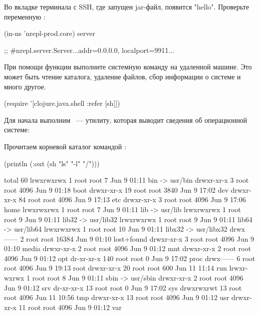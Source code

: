 Во вкладке терминала с SSH, где запущен jar-файл, появится "hello". Проверьте переменную :

\begin{english}
  \begin{clojure}
(in-ns 'nrepl-prod.core)
server

;; #nrepl.server.Server{...addr=0.0.0.0, localport=9911...}
  \end{clojure}
\end{english}

При помощи функции  выполните системную команду на удаленной машине. Это может быть чтение каталога, удаление файлов, сбор информации о системе и много другое.

\begin{english}
  \begin{clojure}
(require '[clojure.java.shell :refer [sh]])
  \end{clojure}
\end{english}

Для начала выполним ~--- утилиту, которая выводит сведения об операционной системе:

\begin{english}
\end{english}

Прочитаем корневой каталог командой :

\begin{english}
  \begin{text}
(println (:out (sh "ls" "-l" "/")))

total 60
lrwxrwxrwx   1 root root     7 Jun  9 01:11 bin -> usr/bin
drwxr-xr-x   3 root root  4096 Jun  9 01:18 boot
drwxr-xr-x  19 root root  3840 Jun  9 17:02 dev
drwxr-xr-x  84 root root  4096 Jun  9 17:13 etc
drwxr-xr-x   3 root root  4096 Jun  9 17:06 home
lrwxrwxrwx   1 root root     7 Jun  9 01:11 lib -> usr/lib
lrwxrwxrwx   1 root root     9 Jun  9 01:11 lib32 -> usr/lib32
lrwxrwxrwx   1 root root     9 Jun  9 01:11 lib64 -> usr/lib64
lrwxrwxrwx   1 root root    10 Jun  9 01:11 libx32 -> usr/libx32
drwx------   2 root root 16384 Jun  9 01:10 lost+found
drwxr-xr-x   3 root root  4096 Jun  9 01:10 media
drwxr-xr-x   2 root root  4096 Jun  9 01:12 mnt
drwxr-xr-x   2 root root  4096 Jun  9 01:12 opt
dr-xr-xr-x 140 root root     0 Jun  9 17:02 proc
drwx------   6 root root  4096 Jun  9 19:13 root
drwxr-xr-x  20 root root   600 Jun 11 11:14 run
lrwxrwxrwx   1 root root     8 Jun  9 01:11 sbin -> usr/sbin
drwxr-xr-x   2 root root  4096 Jun  9 01:12 srv
dr-xr-xr-x  13 root root     0 Jun  9 17:02 sys
drwxrwxrwt  13 root root  4096 Jun 11 10:56 tmp
drwxr-xr-x  13 root root  4096 Jun  9 01:12 usr
drwxr-xr-x  11 root root  4096 Jun  9 01:12 var
  \end{text}
\end{english}

